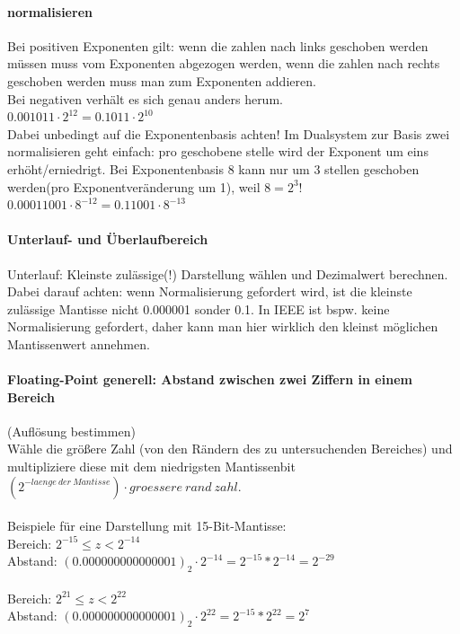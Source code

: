 \documentclass[a4paper]{article}
\begin{document}
		\paragraph{normalisieren} 
			Bei positiven Exponenten gilt: wenn die zahlen nach links geschoben werden müssen muss vom Exponenten abgezogen werden, wenn die zahlen nach rechts geschoben werden muss man zum Exponenten addieren.\\
			Bei negativen verhält es sich genau anders herum.\\
			$0.001011 \cdot 2^{12} = 0.1011 \cdot 2^{10}$\\
			Dabei unbedingt auf die Exponentenbasis achten! Im Dualsystem zur Basis zwei normalisieren geht einfach: pro geschobene stelle wird der Exponent um eins erhöht/erniedrigt. Bei Exponentenbasis 8 kann nur um 3 stellen geschoben werden(pro Exponentveränderung um 1), weil $8 = 2^3$!\\
			$0.00011001 \cdot 8^{-12} = 0.11001 \cdot 8^{-13}$
		\paragraph{Unterlauf- und Überlaufbereich}
			Unterlauf: Kleinste zulässige(!) Darstellung wählen und Dezimalwert berechnen. Dabei darauf achten: wenn Normalisierung gefordert wird, ist die kleinste zulässige Mantisse nicht 0.000001 sonder 0.1. In IEEE ist bspw. keine Normalisierung gefordert, daher kann man hier wirklich den kleinst möglichen Mantissenwert annehmen.
		\paragraph{Floating-Point generell: Abstand zwischen zwei Ziffern in einem Bereich} (Auflösung bestimmen)
			\\Wähle die größere Zahl (von den Rändern des zu untersuchenden Bereiches) und multipliziere diese mit dem niedrigsten Mantissenbit $(2^{-laenge~der~Mantisse}) \cdot groessere~rand~zahl$.\\
			\\Beispiele für eine Darstellung mit 15-Bit-Mantisse:
			\\Bereich: $2^{-15} \leq z < 2^{-14}$
			\\Abstand: $(0.000000000000001)_2 \cdot 2^{-14} = 2^{-15}*2^{-14} = 2^{-29}$\\
			\\Bereich: $2^{21} \leq z < 2^{22}$
			\\Abstand: $(0.000000000000001)_2 \cdot 2^{22} = 2^{-15}*2^{22} = 2^{7}$
\end{document}
